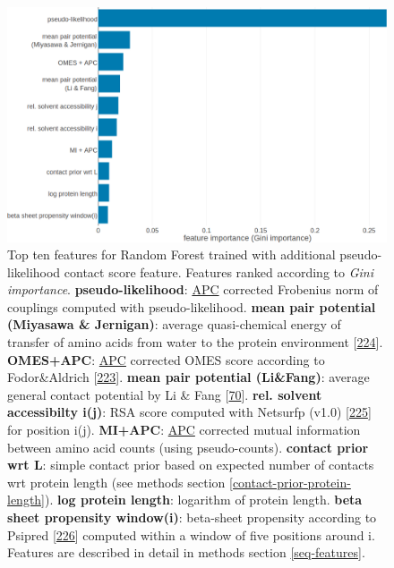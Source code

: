 \documentclass[11pt,a4paper,twoside]{book}
\theoremstyle{definition}
\theoremstyle{definition}
\theoremstyle{remark}
\begin{document}
\begin{figure}

{\centering \includegraphics[width=1\linewidth]{img/random_forest_contact_prior/additional_contat_score_features/feature_random_forest_top_pLLfeature} 

}

\caption{Top ten features for
Random Forest trained with additional pseudo-likelihood contact score
feature. Features ranked according to \emph{Gini importance}.
\textbf{pseudo-likelihood}: \protect\hyperlink{abbrev}{APC} corrected
Frobenius norm of couplings computed with pseudo-likelihood.
\textbf{mean pair potential (Miyasawa \& Jernigan)}: average
quasi-chemical energy of transfer of amino acids from water to the
protein environment {[}\protect\hyperlink{ref-Miyazawa1999a}{224}{]}.
\textbf{OMES+APC}: \protect\hyperlink{abbrev}{APC} corrected OMES score
according to Fodor\&Aldrich
{[}\protect\hyperlink{ref-Fodor2004a}{223}{]}. \textbf{mean pair
potential (Li\&Fang)}: average general contact potential by Li \& Fang
{[}\protect\hyperlink{ref-Li2011}{70}{]}. \textbf{rel. solvent
accessibilty i(j)}: RSA score computed with Netsurfp (v1.0)
{[}\protect\hyperlink{ref-Petersen2009a}{225}{]} for position i(j).
\textbf{MI+APC}: \protect\hyperlink{abbrev}{APC} corrected mutual
information between amino acid counts (using pseudo-counts).
\textbf{contact prior wrt L}: simple contact prior based on expected
number of contacts wrt protein length (see methods section
\ref{contact-prior-protein-length}). \textbf{log protein length}:
logarithm of protein length. \textbf{beta sheet propensity window(i)}:
beta-sheet propensity according to Psipred
{[}\protect\hyperlink{ref-Jones1999}{226}{]} computed within a window of
five positions around i. Features are described in detail in methods
section \ref{seq-features}.}\label{fig:feature-importance-rf-with-pll-score}
\end{figure}
\end{document}
